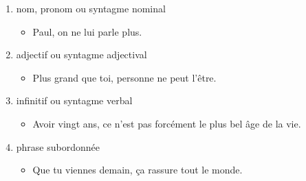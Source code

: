 \documentclass[UTF8]{report}
\begin{document}
\begin{enumerate}
\begin{enumerate}
        \item nom, pronom ou syntagme nominal 
        \begin{itemize}
            \item Paul, on ne lui parle plus.
        \end{itemize}
        \item adjectif ou syntagme adjectival
        \begin{itemize}
            \item Plus grand que toi, personne ne peut l’être.
        \end{itemize}
        \item infinitif ou syntagme verbal
        \begin{itemize}
            \item Avoir vingt ans, ce n’est pas forcément le plus bel âge de la vie.
        \end{itemize}
        \item phrase subordonnée
        \begin{itemize}
            \item Que tu viennes demain, ça rassure tout le monde.
        \end{itemize}
    \end{enumerate}
\end{enumerate}
\end{document}
